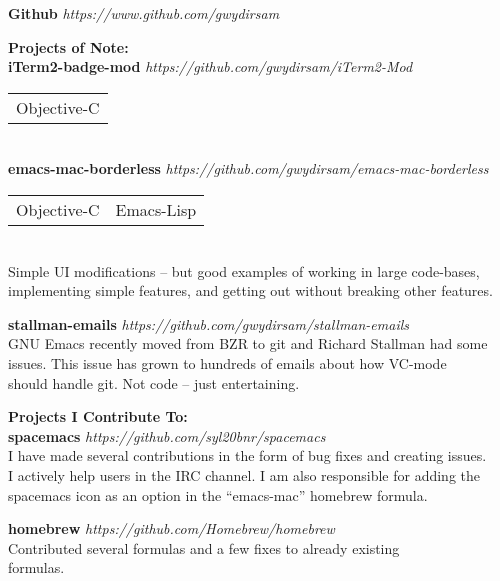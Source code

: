 \documentclass[margin,line,12pt]{res}
\begin{document}
{\begin{resume}
{\bf Github} {\em https://www.github.com/gwydirsam}  \

{\bf Projects of Note: } \\
{\bf iTerm2-badge-mod} {\em  https://github.com/gwydirsam/iTerm2-Mod}  \
\\
\begin{tabular}{l}
  Objective-C
\end{tabular}
\\
{\bf emacs-mac-borderless} {\em https://github.com/gwydirsam/emacs-mac-borderless } \
\\
\begin{tabular}{l l}
  Objective-C & Emacs-Lisp
\end{tabular}
\\
Simple UI modifications -- but good examples of working in large code-bases, \\
implementing simple features, and getting out without breaking other features.

{\bf stallman-emails} {\em https://github.com/gwydirsam/stallman-emails } \
\\
GNU Emacs recently moved from BZR to git and Richard Stallman had some \\ 
issues. This issue has grown to hundreds of emails about how VC-mode \\
should handle git. Not code -- just entertaining.

{\bf Projects I Contribute To: } \\
{\bf spacemacs} {\em https://github.com/syl20bnr/spacemacs}  \
\\
I have made several contributions in the form of bug fixes and creating issues. \\
I actively help users in the IRC channel. I am also responsible for adding the \\
spacemacs icon as an option in the ``emacs-mac'' homebrew formula.

{\bf homebrew} {\em https://github.com/Homebrew/homebrew }  \
\\
Contributed several formulas and a few fixes to already existing \\
formulas.

\vspace*{.20in}
{\color{Black}
  \vspace{-.10in}
}
\end{resume}}
\end{document}
